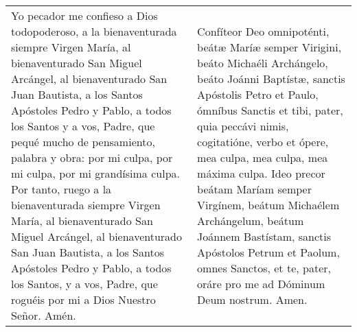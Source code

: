 \documentclass[../devocionario.tex]{subfiles}
\begin{document}
    \begin{longtable} { p{} p{} }
        Yo pecador me confieso a Dios todopoderoso, a la bienaventurada siempre Virgen María, al bienaventurado San Miguel Arcángel, 
        al bienaventurado San Juan Bautista, a los Santos Apóstoles Pedro y Pablo, a todos los Santos y a vos, Padre, que pequé mucho 
        de pensamiento, palabra y obra: por mi culpa, por mi culpa, por mi grandísima culpa. Por tanto, ruego a la bienaventurada 
        siempre Virgen María, al bienaventurado San Miguel Arcángel, al bienaventurado San Juan Bautista, a los Santos Apóstoles 
        Pedro y Pablo, a todos los Santos, y a vos, Padre, que roguéis por mi a Dios Nuestro Señor. Amén. &
        Confíteor Deo omnipoténti, beátæ Maríæ semper Virigini, beáto Michaéli Archángelo, beáto Joánni Baptístæ, sanctis Apóstolis Petro et Paulo, 
        ómníbus Sanctis et tibi, pater, quia peccávi nimis, cogitatióne, verbo et ópere, mea culpa, mea culpa, mea máxima culpa. Ideo precor beátam 
        Maríam semper Virgínem, beátum Michaélem Archángelum, beátum Joánnem Bastístam, sanctis Apóstolos Petrum et Paolum, omnes Sanctos, et te, pater, 
        oráre pro me ad Dóminum Deum nostrum. Amen.
    \end{longtable}
\end{document}
